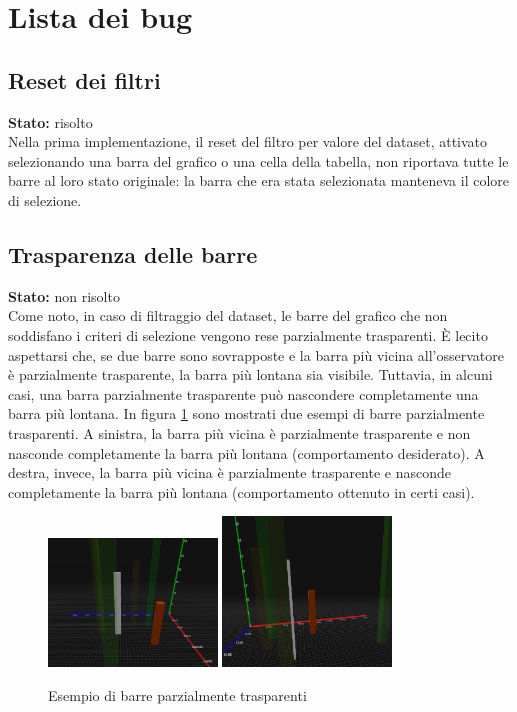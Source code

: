 \section{Lista dei bug}
\subsection{Reset dei filtri}
\textbf{Stato:} risolto\\
Nella prima implementazione, il reset del filtro per valore del dataset,
attivato selezionando una barra del grafico o una cella della tabella,
non riportava tutte le barre al loro stato originale: la barra che era
stata selezionata manteneva il colore di selezione.

\subsection{Trasparenza delle barre}
\textbf{Stato:} non risolto\\
Come noto, in caso di filtraggio del dataset, le barre del grafico
che non soddisfano i criteri di selezione vengono rese parzialmente trasparenti.
È lecito aspettarsi che, se due barre sono sovrapposte e la barra più vicina all'osservatore
è parzialmente trasparente, la barra più lontana sia visibile. Tuttavia, in alcuni casi,
una barra parzialmente trasparente può nascondere completamente una barra più lontana.
In figura \ref{fig:trasparenza} sono mostrati due esempi di barre parzialmente trasparenti.
A sinistra, la barra più vicina è parzialmente trasparente e non nasconde
completamente la barra più lontana (comportamento desiderato). A destra, invece,
la barra più vicina è parzialmente trasparente e nasconde completamente la barra 
più lontana (comportamento ottenuto in certi casi).
\begin{figure}[h!]
    \centering
    \includegraphics[width=0.4\textwidth]{template/images/barreok.png}
    \hspace{0.5cm}
    \includegraphics[width=0.4\textwidth]{template/images/barre.png}
    \caption{Esempio di barre parzialmente trasparenti}
    \label{fig:trasparenza}
\end{figure}

